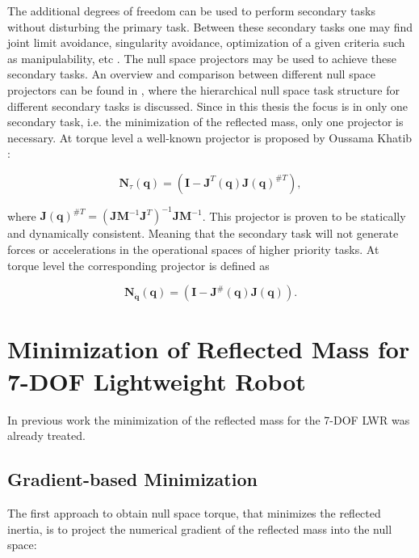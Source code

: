 The additional degrees of freedom can be used to perform secondary tasks without disturbing the primary task. Between these secondary tasks one may find joint limit avoidance, singularity avoidance, optimization of a given criteria such as manipulability, etc  \cite{redundancy_1}. 
The null space projectors may be used to achieve these secondary tasks. An overview and comparison between different null space projectors can be found in \cite{JLA_5}, where the hierarchical null space task structure for different secondary tasks is discussed. Since in this thesis the focus is in only one secondary task, i.e. the minimization of the reflected mass, only one projector is necessary. At torque level a well-known projector is proposed by Oussama Khatib \cite{khatib1995}:

\begin{equation}
	\mathbf{N}_{\tau}(\mathbf{q}) = \left(\mathbf{I}-\mathbf{J}^{T}(\mathbf{q})\mathbf{J}(\mathbf{q})^{\#T}\right),
	\label{eq:proj_tau_khatib}
\end{equation}

where $\mathbf{J}(\mathbf{q})^{\#T} = (\mathbf{J}\mathbf{ M}^{-1} \mathbf{J}^T)^{-1} \mathbf{J} \mathbf{M}^{-1}$. This projector is proven to be statically and dynamically consistent. Meaning that the secondary task will not generate forces or accelerations in the operational spaces of higher priority tasks.
At torque level the corresponding projector is defined as

\begin{equation}
\mathbf{N}_{\mathbf{\dot{q}}}(\mathbf{q}) = \left(\mathbf{I}-\mathbf{J}^{\#}(\mathbf{q})\mathbf{J}(\mathbf{q})\right).
\label{eq:proj_dq_khatib}
\end{equation}






\section{Minimization of Reflected Mass for 7-DOF Lightweight Robot}
\label{sec:control_LWR}

In previous work \cite{paper_iros2017} the minimization of the reflected mass for the 7-DOF LWR was already treated.  
\subsection{Gradient-based  Minimization}
\label{subsec:gbm_7DOF}

The first approach to obtain null space torque, that minimizes the reflected inertia, is to project the numerical gradient of the reflected mass into the null space:
 
